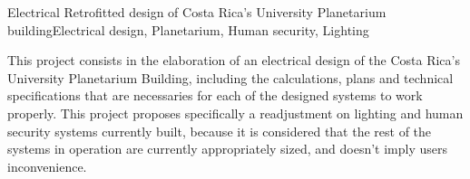 
\begin{theabstract}{Electrical Retrofitted design of Costa Rica’s University Planetarium building}{Electrical design, Planetarium, Human security, Lighting}

This project consists in the elaboration of an electrical design of the Costa Rica’s University Planetarium Building, including the calculations, plans and technical specifications that are necessaries for each of the designed systems to work properly. This project proposes specifically a readjustment on lighting and human security systems currently built, because it is considered that the rest of the systems in operation are currently appropriately sized, and doesn't imply users inconvenience.

\end{theabstract}



%	
%	
%	
